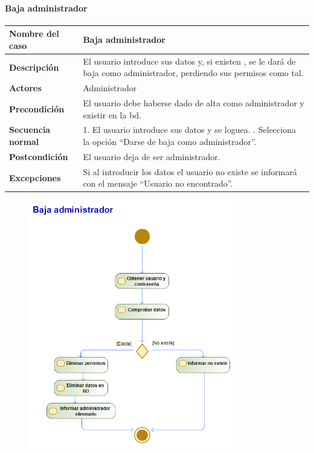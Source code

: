 \paragraph{Baja administrador}
\begin{table}[H]
	\centering
	\small
	\begin{tabularx}{0.8\textwidth}{|p{3.5cm}|X|}
		\hline
		\rowcolor{lightgray}
		\textbf{Nombre del caso}  & \textbf{Baja administrador}                                                                                            \\
		\hline
		\textbf{Descripción}      & El usuario introduce sus datos y, si existen , se le dará de baja como administrador, perdiendo sus permisos como tal. \\
		\hline
		\textbf{Actores}          & Administrador                                                                                                          \\
		\hline
		\textbf{Precondición}     & El usuario debe haberse dado de alta como administrador y existir en la \gls{bd}.                                      \\
		\hline
		\textbf{Secuencia normal} & 1. El usuario introduce sus datos y se loguea. \newline
		2. Selecciona la opción ``Darse de baja como administrador''.                                                                                      \\
		\hline
		\textbf{Postcondición}    & El usuario deja de ser administrador.                                                                                  \\
		\hline
		\textbf{Excepciones}      & Si al introducir los datos el usuario no existe se informará con el mensaje ``Usuario no encontrado''.                 \\
		\hline
	\end{tabularx}
\end{table}
\begin{figure}[H]
	\centering
	\includegraphics[width=0.8\textwidth]{Use_Cases/baja_admin.png}
\end{figure}
\newpage
